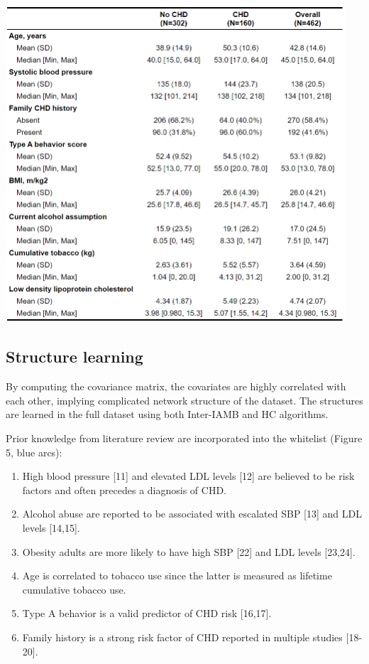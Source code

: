 \documentclass{article}
\begin{document}
\begin{center}
\includegraphics[width=4.98in,height=4.64in]{./media/image5.png}
\end{center}
\vspace{-2.5em}


\subsection{Structure learning}
By computing the covariance matrix, the covariates are highly correlated with each other, implying complicated network structure of the dataset. The structures are learned in the full dataset using both Inter-IAMB and HC algorithms. \par

Prior knowledge from literature review are incorporated into the whitelist (Figure 5, blue arcs): 
\vspace{-1.5em}
\begin{enumerate}
\setlength\itemsep{0em}
\setlength\itemindent{-1em}
	\item High blood pressure [11] and elevated LDL levels [12] are believed to be risk factors and often precedes a diagnosis of CHD.
	\item Alcohol abuse are reported to be associated with escalated SBP [13] and LDL levels [14,15]. 
	\item Obesity adults are more likely to have high SBP [22] and LDL levels [23,24].  
	\item Age is correlated to tobacco use since the latter is measured as lifetime cumulative tobacco use. 
	\item Type A behavior is a valid predictor of CHD risk [16,17]. 
	\item Family history is a strong risk factor of CHD reported in multiple studies [18-20]. 
\end{enumerate} \par
\end{document}
